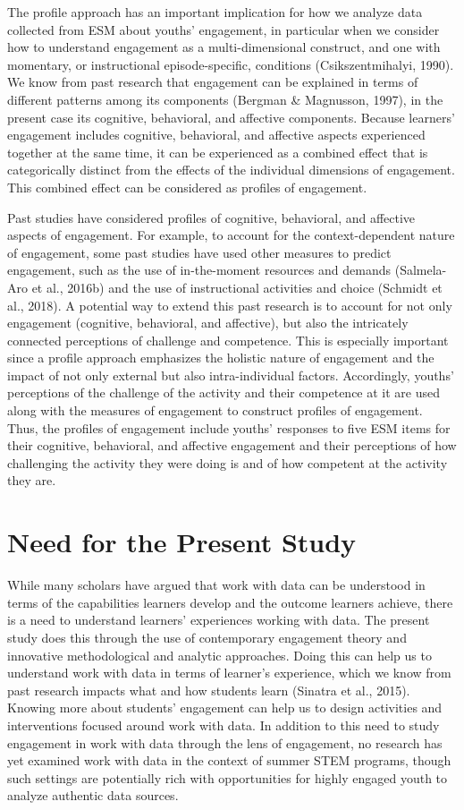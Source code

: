 \documentclass[]{msu-thesis}
\theoremstyle{definition}
\theoremstyle{definition}
\theoremstyle{definition}
\theoremstyle{remark}
\begin{document}
The profile approach has an important implication for how we analyze
data collected from ESM about youths' engagement, in particular when we
consider how to understand engagement as a multi-dimensional construct,
and one with momentary, or instructional episode-specific, conditions
(Csikszentmihalyi, 1990). We know from past research that engagement can
be explained in terms of different patterns among its components
(Bergman \& Magnusson, 1997), in the present case its cognitive,
behavioral, and affective components. Because learners' engagement
includes cognitive, behavioral, and affective aspects experienced
together at the same time, it can be experienced as a combined effect
that is categorically distinct from the effects of the individual
dimensions of engagement. This combined effect can be considered as
profiles of engagement.

Past studies have considered profiles of cognitive, behavioral, and
affective aspects of engagement. For example, to account for the
context-dependent nature of engagement, some past studies have used
other measures to predict engagement, such as the use of in-the-moment
resources and demands (Salmela-Aro et al., 2016b) and the use of
instructional activities and choice (Schmidt et al., 2018). A potential
way to extend this past research is to account for not only engagement
(cognitive, behavioral, and affective), but also the intricately
connected perceptions of challenge and competence. This is especially
important since a profile approach emphasizes the holistic nature of
engagement and the impact of not only external but also intra-individual
factors. Accordingly, youths' perceptions of the challenge of the
activity and their competence at it are used along with the measures of
engagement to construct profiles of engagement. Thus, the profiles of
engagement include youths' responses to five ESM items for their
cognitive, behavioral, and affective engagement and their perceptions of
how challenging the activity they were doing is and of how competent at
the activity they are.

\section{Need for the Present Study}\label{need-for-the-present-study}

While many scholars have argued that work with data can be understood in
terms of the capabilities learners develop and the outcome learners
achieve, there is a need to understand learners' experiences working
with data. The present study does this through the use of contemporary
engagement theory and innovative methodological and analytic approaches.
Doing this can help us to understand work with data in terms of
learner's experience, which we know from past research impacts what and
how students learn (Sinatra et al., 2015). Knowing more about students'
engagement can help us to design activities and interventions focused
around work with data. In addition to this need to study engagement in
work with data through the lens of engagement, no research has yet
examined work with data in the context of summer STEM programs, though
such settings are potentially rich with opportunities for highly engaged
youth to analyze authentic data sources.
\end{document}
